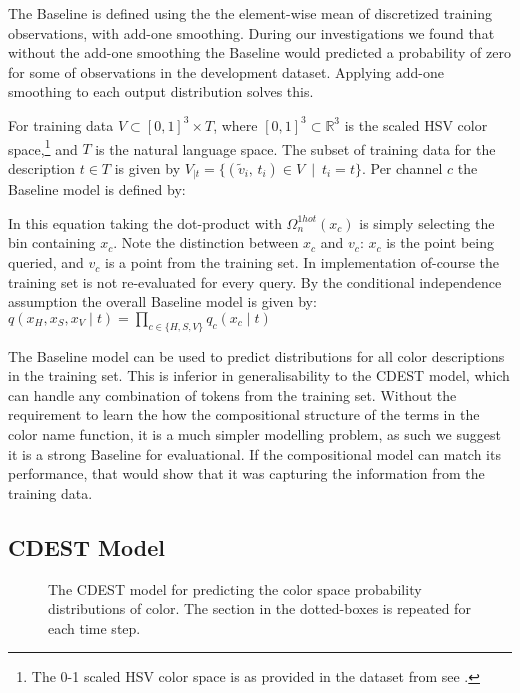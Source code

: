 \documentclass[11pt,a4paper]{article}
\newcommand{\compactmath}[1]{\noindent\resizebox{\columnwidth}{!}{$#1$}}
\newcommand{\textcite}{\cite}
\begin{document}
The Baseline is defined using the the element-wise mean of discretized  training observations, with add-one smoothing.
During our investigations we found that without the add-one smoothing the Baseline would predicted a probability of zero for some of observations in the development dataset.
Applying add-one smoothing to each output distribution solves this.

For training data $V \subset \left[ 0,1 \right] ^{3}\times T$, where $\left[ 0,1 \right] ^{3} \subset \mathbb{R}^{3}$ is the scaled HSV color space,\footnote{The 0-1 scaled HSV color space is as provided in the dataset from \textcite{mcmahan2015bayesian} see .} and $T$ is the natural language space.
The subset of training data for the description $t \in T$ is given by
$V_{|t}=\{(\tilde{v}_i,\,t_i) \in V \: \mid \: t_{i}=t\}$.
Per channel $c$ the Baseline model is defined by: 

\compactmath{
	q_{c}(x_{c}\mid t)=\frac{\displaystyle
		\sum_{\mathrlap{\!\!\forall((v_{H},v_{S},v_{V}),t)\in V_{|t}}}
			\Omega_n^{blur}(v_{c},\mathcal{D}_c,\sigma)
			\cdot
			\Omega_n^{1hot}(x_{c})		
			+1}
		{\left|V_{|t}\right|+n}
}
%
In this equation taking the dot-product with $\Omega_n^{1hot}(x_{c})$ is simply selecting the bin containing $x_c$.
Note the distinction between $x_c$ and $v_c$: $x_c$ is the point being queried, and $v_c$ is a point from the training set.
In implementation of-course the training set is not re-evaluated for every query.
By the conditional independence assumption the overall Baseline model is given by: $q(x_H,x_S,x_V\mid t) = \prod_{c\in {\{H,S,V\}}} q_c(x_c\mid t)$


The Baseline model can be used to predict distributions for all color descriptions in the training set.
This is inferior in generalisability to the CDEST model, which can handle any combination of tokens from the training set.
Without the requirement to learn the how the compositional structure of the terms in the color name function, it is a much simpler modelling problem, as such we suggest it is a strong Baseline for evaluational.
If the compositional model can match its performance, that would show that it was capturing the information from the training data.

\subsection{CDEST Model}

\begin{figure}
	\resizebox{\columnwidth}{!}{}
	
	\caption{\label{network}
		The CDEST model for predicting the color space probability distributions of color.
		The section in the dotted-boxes is repeated for each time step.
	}
\end{figure}
\end{document}
